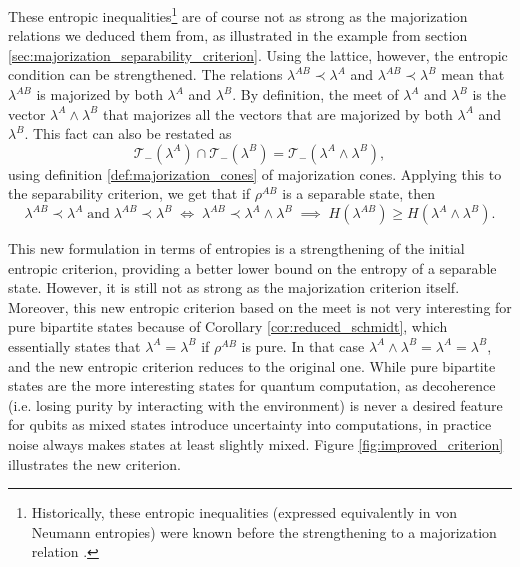 These entropic inequalities\footnote{Historically, these entropic inequalities (expressed equivalently in von Neumann entropies) were known before the strengthening to a majorization relation \cite{cerf_negative_1997, nielsen_separable_2001}.} are of course not as strong as the majorization relations we deduced them from, as illustrated in the example from section \ref{sec:majorization_separability_criterion}. Using the lattice, however, the entropic condition can be strengthened. The relations $\lambda^{AB} \prec \lambda^A$ and $\lambda^{AB} \prec \lambda^{B}$ mean that $\lambda^{AB}$ is majorized by both $\lambda^A$ and $\lambda^B$. By definition, the meet of $\lambda^A$ and $\lambda^B$ is the vector $\lambda^A \wedge \lambda^B$ that majorizes all the vectors that are majorized by both $\lambda^A$ and $\lambda^B$. This fact can also be restated as 
\begin{equation}
    \mathcal{T}_-(\lambda^A) \cap \mathcal{T}_-(\lambda^B) = \mathcal{T}_-(\lambda^A \wedge \lambda^B),
\end{equation}
\noindent using definition \ref{def:majorization_cones} of majorization cones. Applying this to the separability criterion, we get that if $\rho^{AB}$ is a separable state, then
\begin{equation}
    \lambda^{AB} \prec \lambda^A \; \text{and} \; \lambda^{AB} \prec \lambda^{B} \; \iff \; \lambda^{AB} \prec \lambda^A \wedge \lambda^B \; \implies \; H(\lambda^{AB}) \geq H(\lambda^A \wedge \lambda^B).
\end{equation}

This new formulation in terms of entropies is a strengthening of the initial entropic criterion, providing a better lower bound on the entropy of a separable state. However, it is still not as strong as the majorization criterion itself. Moreover, this new entropic criterion based on the meet is not very interesting for pure bipartite states because of Corollary \ref{cor:reduced_schmidt}, which essentially states that $\lambda^A = \lambda^B$ if $\rho^{AB}$ is pure. In that case $\lambda^A \wedge \lambda^B = \lambda^A = \lambda^B$, and the new entropic criterion reduces to the original one. While pure bipartite states are the more interesting states for quantum computation, as decoherence (i.e. losing purity by interacting with the environment) is never a desired feature for qubits as mixed states introduce uncertainty into computations, in practice noise always makes states at least slightly mixed. Figure \ref{fig:improved_criterion} illustrates the new criterion.


